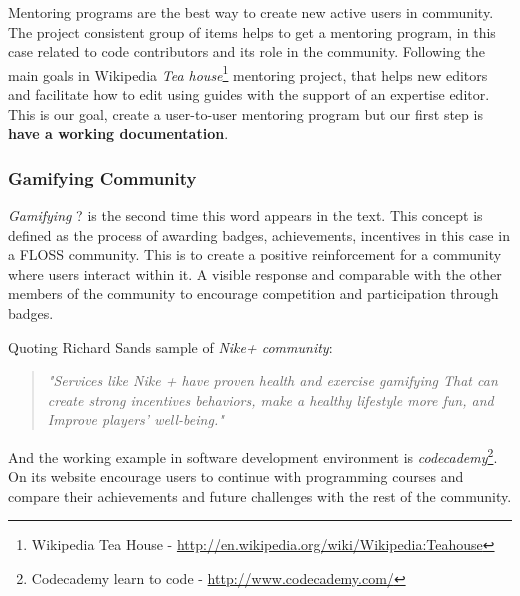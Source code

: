 \documentclass[11pt]{scrartcl}
\begin{document}
\par Mentoring programs are the best way to create new active users in community. The project consistent group of items helps to get a mentoring program, in this case related to code contributors and its role in the community. Following the main goals in Wikipedia \emph{Tea house}\footnote{Wikipedia Tea House - \url{http://en.wikipedia.org/wiki/Wikipedia:Teahouse}} mentoring project, that helps new editors and facilitate how to edit using guides with the support of an expertise editor. This is our goal, create a user-to-user mentoring program but our first step is \textbf{have a working documentation}.



\subsubsection{Gamifying Community}
\label{sub:gamifying-community}

\emph{Gamifying} ? is the second time this word appears in the text. This concept is defined as the process of awarding badges, achievements, incentives in this case in a FLOSS community. This is to create a positive reinforcement for a community where users interact within it. A visible response and comparable with the other members of the community to encourage competition and participation through badges.

Quoting Richard Sands sample of \emph{Nike+ community}:

\begin{quotation}
    \begin{center}
        \emph{"Services like Nike + have proven health and exercise gamifying That can create strong incentives behaviors, make a healthy lifestyle more fun, and Improve players' well-being."}
    \end{center}
\end{quotation}

\par And the working example in software development environment is \emph{codecademy}\footnote{Codecademy learn to code - \url{http://www.codecademy.com/}}. On its website encourage users to continue with programming courses and compare their achievements and future challenges with the rest of the community.
\end{document}
